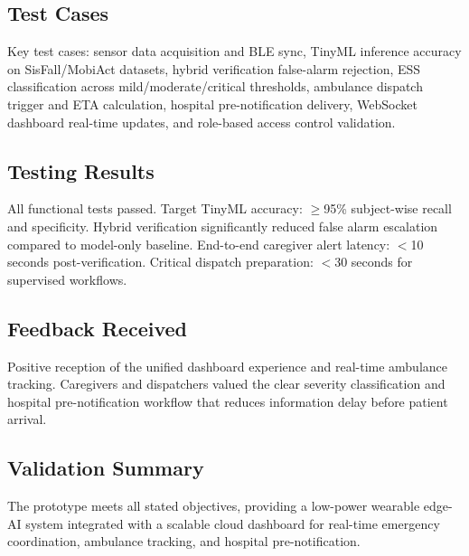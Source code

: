 \subsection{Test Cases}

Key test cases: sensor data acquisition and BLE sync, TinyML inference accuracy on SisFall/MobiAct datasets, hybrid verification false-alarm rejection, ESS classification across mild/moderate/critical thresholds, ambulance dispatch trigger and ETA calculation, hospital pre-notification delivery, WebSocket dashboard real-time updates, and role-based access control validation.

\subsection{Testing Results}

All functional tests passed. Target TinyML accuracy: $\geq$95\% subject-wise recall and specificity. Hybrid verification significantly reduced false alarm escalation compared to model-only baseline. End-to-end caregiver alert latency: $<$10 seconds post-verification. Critical dispatch preparation: $<$30 seconds for supervised workflows.

\subsection{Feedback Received}

Positive reception of the unified dashboard experience and real-time ambulance tracking. Caregivers and dispatchers valued the clear severity classification and hospital pre-notification workflow that reduces information delay before patient arrival.

\subsection{Validation Summary}

The prototype meets all stated objectives, providing a low-power wearable edge-AI system integrated with a scalable cloud dashboard for real-time emergency coordination, ambulance tracking, and hospital pre-notification.
